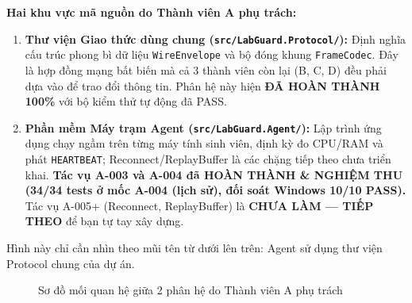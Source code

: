 \documentclass[12pt,a4paper]{article}
\begin{document}
\begin{conceptbox}
\textbf{Hai khu vực mã nguồn do Thành viên A phụ trách:}
\begin{enumerate}
  \item \textbf{Thư viện Giao thức dùng chung (\texttt{src/LabGuard.Protocol/}):} Định nghĩa cấu trúc phong bì dữ liệu \texttt{WireEnvelope} và bộ đóng khung \texttt{FrameCodec}. Đây là hợp đồng mạng bất biến mà cả 3 thành viên còn lại (B, C, D) đều phải dựa vào để trao đổi thông tin. Phân hệ này hiện \textbf{ĐÃ HOÀN THÀNH 100\%} với bộ kiểm thử tự động đã PASS.
  \item \textbf{Phần mềm Máy trạm Agent (\texttt{src/LabGuard.Agent/}):} Lập trình ứng dụng chạy ngầm trên từng máy tính sinh viên, định kỳ đo CPU/RAM và phát \texttt{HEARTBEAT}; Reconnect/ReplayBuffer là các chặng tiếp theo chưa triển khai. \textbf{Tác vụ A-003 và A-004 đã HOÀN THÀNH \& NGHIỆM THU (34/34 tests ở mốc A-004 (lịch sử), đối soát Windows 10/10 PASS).} Tác vụ A-005+ (Reconnect, ReplayBuffer) là \textbf{CHƯA LÀM — TIẾP THEO} để bạn tự tay xây dựng.
\end{enumerate}
\end{conceptbox}

Hình này chỉ cần nhìn theo mũi tên từ dưới lên trên: Agent sử dụng thư viện Protocol chung của dự án.

\begin{figure}[H]
  \centering
  \caption{Sơ đồ mối quan hệ giữa 2 phân hệ do Thành viên A phụ trách}
  \label{fig:member_a_scope}
\end{figure}
\end{document}
